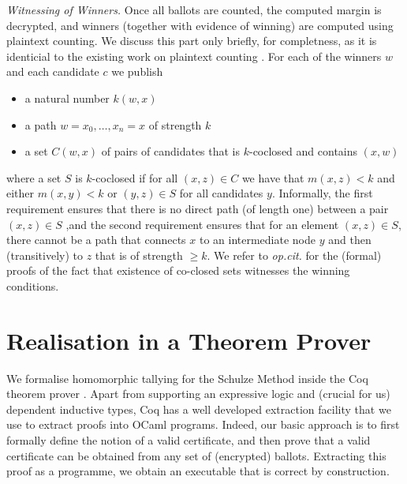 \documentclass{llncs}
\begin{document}
\smallskip\noindent\emph{Witnessing of Winners.}
Once all ballots are counted, the computed margin is decrypted, and
winners (together with evidence of winning) are computed using 
plaintext counting. We discuss this part only briefly, for completness,
 as it is identicial to the existing work on plaintext counting
\cite{Pattinson:2017:SVE}. For each of the winners $w$ and each
candidate $c$ we publish
\begin{itemize}
\item a natural number $k(w, x)$
\item a path $w = x_0, \dots, x_n = x$ of strength $k$
\item a set $C(w, x)$ of pairs of candidates that is $k$-coclosed
and contains $(x, w)$
\end{itemize}
where a set $S$ is  $k$-coclosed if for all $(x,z) \in C$ we have
that $m(x, z) < k$ and either $m(x, y) < k$ or $(y,z) \in S$ for
all candidates $y$.  Informally, the first requirement ensures that
there is no direct path (of length one) between a pair $(x, z) \in
S$ ,and the second requirement ensures that for an element $(x, z)
\in S$, there cannot be a path that connects $x$ to an intermediate
node $y$ and then (transitively) to $z$ that is of strength $\geq
k$. 
We refer to \emph{op.cit.} for the (formal)
proofs of the fact that existence of co-closed sets witnesses the
winning conditions. 
  



\section{Realisation in a Theorem Prover} \label{sec:realisation}

We formalise homomorphic tallying for the Schulze Method inside the
Coq theorem prover \cite{Bertot:2004:ITP}. Apart from supporting an
expressive logic and (crucial for us) dependent inductive types, Coq
has a well developed extraction facility that 
we use to extract proofs into OCaml programs. Indeed, our basic
approach is to first formally define the notion of a valid
certificate, and then prove that a valid certificate can be obtained
from any set of (encrypted) ballots. Extracting this proof as a
programme, we obtain an executable that is correct by construction. 
\end{document}

